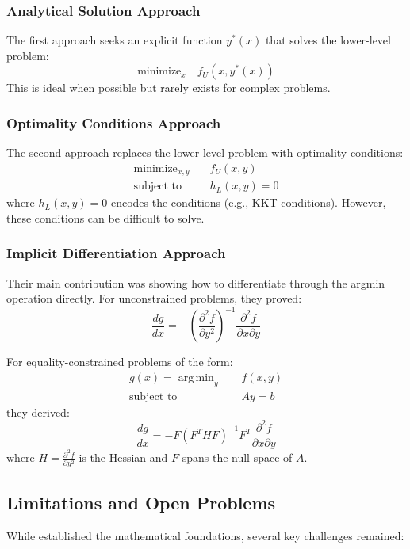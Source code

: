 \documentclass{article}
\DeclareMathOperator*{\argmin}{arg\,min}
\begin{document}
\subsubsection{Analytical Solution Approach}
The first approach seeks an explicit function $y^*(x)$ that solves the lower-level problem:
\begin{equation}
    \text{minimize}_x \quad f_U(x, y^*(x))
\end{equation}
This is ideal when possible but rarely exists for complex problems.

\subsubsection{Optimality Conditions Approach}
The second approach replaces the lower-level problem with optimality conditions:
\begin{align*}
    \text{minimize}_{x,y} \quad & f_U(x,y) \\
    \text{subject to} \quad & h_L(x,y) = 0
\end{align*}
where $h_L(x,y)=0$ encodes the conditions (e.g., KKT conditions). However, these conditions can be difficult to solve.

\subsubsection{Implicit Differentiation Approach}
Their main contribution was showing how to differentiate through the argmin operation directly. For unconstrained problems, they proved:
\begin{equation}
    \frac{dg}{dx} = -\left(\frac{\partial^2 f}{\partial y^2}\right)^{-1}\frac{\partial^2 f}{\partial x \partial y}
\end{equation}

For equality-constrained problems of the form:
\begin{align*}
    g(x) = \argmin_y \quad & f(x,y) \\
    \text{subject to} \quad & Ay = b
\end{align*}
they derived:
\begin{equation}
    \frac{dg}{dx} = -F(F^T H F)^{-1}F^T\frac{\partial^2 f}{\partial x \partial y}
\end{equation}
where $H = \frac{\partial^2 f}{\partial y^2}$ is the Hessian and $F$ spans the null space of $A$.

\subsection{Limitations and Open Problems}
While \citep{gould2016differentiating} established the mathematical foundations, several key challenges remained:
\end{document}
